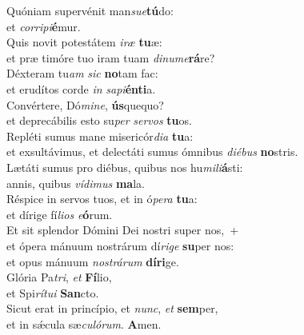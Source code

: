 \evenverse Quóniam supervénit man\textit{su}\textit{e}\textbf{tú}do:~\*\\
\evenverse et \textit{cor}\textit{ri}\textit{pi}\textbf{é}mur.\\
\oddverse Quis novit potestátem \textit{i}\textit{ræ} \textbf{tu}æ:~\*\\
\oddverse et præ timóre tuo iram tuam \textit{di}\textit{nu}\textit{me}\textbf{rá}re?\\
\evenverse Déxteram tu\textit{am} \textit{sic} \textbf{no}tam fac:~\*\\
\evenverse et erudítos corde \textit{in} \textit{sa}\textit{pi}\textbf{én}\textbf{ti}a.\\
\oddverse Convértere, Dó\textit{mi}\textit{ne}, \textbf{ús}quequo?~\*\\
\oddverse et deprecábilis esto su\textit{per} \textit{ser}\textit{vos} \textbf{tu}os.\\
\evenverse Repléti sumus mane misericór\textit{di}\textit{a} \textbf{tu}a:~\*\\
\evenverse et exsultávimus, et delectáti sumus ómnibus \textit{di}\textit{é}\textit{bus} \textbf{no}stris.\\
\oddverse Lætáti sumus pro diébus, quibus nos hu\textit{mi}\textit{li}\textbf{á}sti:~\*\\
\oddverse annis, quibus \textit{ví}\textit{di}\textit{mus} \textbf{ma}la.\\
\evenverse Réspice in servos tuos, et in ó\textit{pe}\textit{ra} \textbf{tu}a:~\*\\
\evenverse et dírige fí\textit{li}\textit{os} \textit{e}\textbf{ó}rum.\\
\oddverse Et sit splendor Dómini Dei nostri super nos,~+\\
\oddverse  et ópera mánuum nostrárum dí\textit{ri}\textit{ge} \textbf{su}per nos:~\*\\
\oddverse et opus mánuum \textit{no}\textit{strá}\textit{rum} \textbf{dí}\textbf{ri}ge.\\
\evenverse Glória Pa\textit{tri}, \textit{et} \textbf{Fí}lio,~\*\\
\evenverse et Spi\textit{rí}\textit{tu}\textit{i} \textbf{San}cto.\\
\oddverse Sicut erat in princípio, et \textit{nunc}, \textit{et} \textbf{sem}per,~\*\\
\oddverse et in sǽcula sæ\textit{cu}\textit{ló}\textit{rum}. \textbf{A}men.\\
